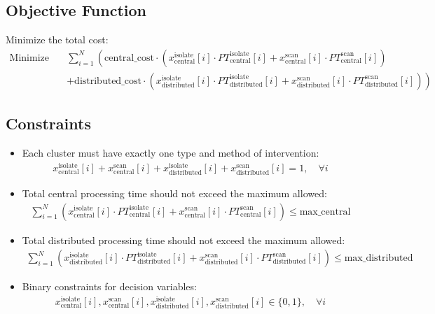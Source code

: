 \documentclass{article}
\begin{document}
\subsection*{Objective Function}
Minimize the total cost:
\begin{align*}
\text{Minimize} \quad & \sum_{i=1}^{N} \left( \text{central\_cost} \cdot \left( x_{\text{central}}^{\text{isolate}}[i] \cdot PT_{\text{central}}^{\text{isolate}}[i] + x_{\text{central}}^{\text{scan}}[i] \cdot PT_{\text{central}}^{\text{scan}}[i] \right) \right.\\
& \left. + \text{distributed\_cost} \cdot \left( x_{\text{distributed}}^{\text{isolate}}[i] \cdot PT_{\text{distributed}}^{\text{isolate}}[i] + x_{\text{distributed}}^{\text{scan}}[i] \cdot PT_{\text{distributed}}^{\text{scan}}[i] \right) \right)
\end{align*}

\subsection*{Constraints}
\begin{itemize}
    \item Each cluster must have exactly one type and method of intervention:
    \begin{align*}
    x_{\text{central}}^{\text{isolate}}[i] + x_{\text{central}}^{\text{scan}}[i] + x_{\text{distributed}}^{\text{isolate}}[i] + x_{\text{distributed}}^{\text{scan}}[i] = 1, \quad \forall i
    \end{align*}

    \item Total central processing time should not exceed the maximum allowed:
    \begin{align*}
    \sum_{i=1}^{N} \left( x_{\text{central}}^{\text{isolate}}[i] \cdot PT_{\text{central}}^{\text{isolate}}[i] + x_{\text{central}}^{\text{scan}}[i] \cdot PT_{\text{central}}^{\text{scan}}[i] \right) \leq \text{max\_central}
    \end{align*}

    \item Total distributed processing time should not exceed the maximum allowed:
    \begin{align*}
    \sum_{i=1}^{N} \left( x_{\text{distributed}}^{\text{isolate}}[i] \cdot PT_{\text{distributed}}^{\text{isolate}}[i] + x_{\text{distributed}}^{\text{scan}}[i] \cdot PT_{\text{distributed}}^{\text{scan}}[i] \right) \leq \text{max\_distributed}
    \end{align*}

    \item Binary constraints for decision variables:
    \begin{align*}
    x_{\text{central}}^{\text{isolate}}[i], x_{\text{central}}^{\text{scan}}[i], x_{\text{distributed}}^{\text{isolate}}[i], x_{\text{distributed}}^{\text{scan}}[i] \in \{0, 1\}, \quad \forall i
    \end{align*}
\end{itemize}
\end{document}
